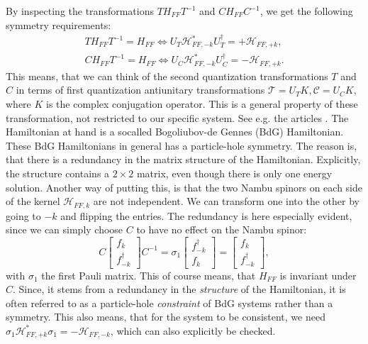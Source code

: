 By inspecting the transformations $TH_{FF}T^{-1}$ and $CH_{FF}C^{-1}$, we get the following symmetry requirements:
\begin{align}
TH_{FF}T^{-1} = H_{FF} \Leftrightarrow U_T\mathcal{H}^*_{FF,-k} U^\dagger_T = + \mathcal{H}_{FF,+k}, \nonumber \\
CH_{FF}T^{-1} = H_{FF} \Leftrightarrow U_C\mathcal{H}^*_{FF,-k} U^\dagger_C = - \mathcal{H}_{FF,+k}. 
\label{eq.Symmetryrequirements}
\end{align}
This means, that we can think of the second quantization transformations $T$ and $C$ in terms of first quantization antiunitary transformations $\mathcal{T} = U_TK, \mathcal{C} = U_CK$, where $K$ is the complex conjugation operator. This is a general property of these transformation, not restricted to our specific system. See e.g. the articles \cite{Ludwig.Topology, Chiu.Topology}. The Hamiltonian at hand is a socalled Bogoliubov-de Gennes (BdG) Hamiltonian. These BdG Hamiltonians in general has a particle-hole symmetry. The reason is, that there is a redundancy in the matrix structure of the Hamiltonian. Explicitly, the structure contains a $2\times 2$ matrix, even though there is only one energy solution. Another way of putting this, is that the two Nambu spinors on each side of the kernel $\mathcal{H}_{FF,k}$ are not independent. We can transform one into the other by going to $-k$ and flipping the entries. The redundancy is here especially evident, since we can simply choose $C$ to have no effect on the Nambu spinor:
\begin{equation}
C \begin{bmatrix} f_k \\ f^\dagger_{-k} \end{bmatrix} C^{-1} =  \sigma_1 \begin{bmatrix} f^\dagger_{-k} \\ f_{k} \end{bmatrix} = \begin{bmatrix} f_k \\ f^\dagger_{-k} \end{bmatrix}, 
\end{equation}
with $\sigma_1$ the first Pauli matrix. This of course means, that $H_{FF}$ is invariant under $C$. Since, it stems from a redundancy in the \textit{structure} of the Hamiltonian, it is often referred to as a particle-hole \textit{constraint} of BdG systems rather than a symmetry. This also means, that for the system to be consistent, we need $\sigma_1\mathcal{H}^*_{FF,+k} \sigma_1 = - \mathcal{H}_{FF,-k}$, which can also explicitly be checked. 

